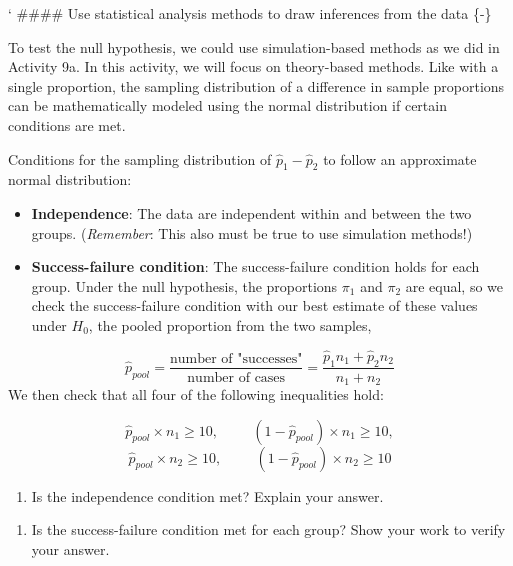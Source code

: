 \documentclass[
]{report}
\providecommand{\tightlist}{%
  \setlength{\itemsep}{0pt}\setlength{\parskip}{0pt}}
\begin{document}
`
\#\#\#\# Use statistical analysis methods to draw inferences from the data \{-\}

To test the null hypothesis, we could use simulation-based methods as we did in Activity 9a. In this activity, we will focus on theory-based methods. Like with a single proportion, the sampling distribution of a difference in sample proportions can be mathematically modeled using the normal distribution if certain conditions are met.

Conditions for the sampling distribution of \(\hat{p}_1-\hat{p}_2\) to follow an approximate normal distribution:

\begin{itemize}
\item
  \textbf{Independence}: The data are independent within and between the two groups. (\emph{Remember}: This also must be true to use simulation methods!)
\item
  \textbf{Success-failure condition}: The success-failure condition holds for each group. Under the null hypothesis, the proportions \(\pi_1\) and \(\pi_2\) are equal, so we check the success-failure condition with our best estimate of these values under \(H_0\), the pooled proportion from the two samples,
\end{itemize}

\[
\hat{p}_{pool} = \frac{\text{number of "successes"}}{\text{number of cases}} = \frac{\hat{p}_1 n_1+\hat{p}_2 n_2}{n_1+n_2}
\]
We then check that all four of the following inequalities hold:

\[\hat{p}_{pool} \times n_1 \ge 10, \hspace{1cm} (1 - \hat{p}_{pool}) \times n_1 \geq 10,\]
\[\hat{p}_{pool} \times n_2 \ge 10, \hspace{1cm} (1 - \hat{p}_{pool}) \times n_2 \geq 10\]

\vspace{.1in}

\begin{enumerate}
\def\labelenumi{\arabic{enumi}.}
\setcounter{enumi}{2}
\tightlist
\item
  Is the independence condition met? Explain your answer.
\end{enumerate}

\vspace{0.4in}

\begin{enumerate}
\def\labelenumi{\arabic{enumi}.}
\setcounter{enumi}{3}
\tightlist
\item
  Is the success-failure condition met for each group? Show your work to verify your answer.
\end{enumerate}
\end{document}
